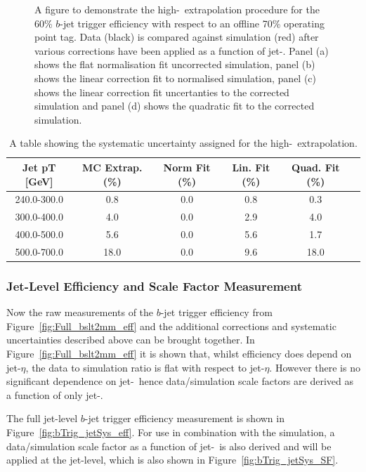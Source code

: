 \begin{figure}[!ht]
\begin{center}
\end{center}
\caption{A figure to demonstrate the high-\pT~extrapolation procedure for the 60\% $b$-jet trigger efficiency with respect to an offline 70\% operating point tag.
  Data (black) is compared against simulation (red) after various corrections have been applied  as a function of jet-\pT.
  Panel (a) shows the flat normalisation fit uncorrected simulation, panel (b) shows the linear correction fit to normalised simulation,
  panel (c) shows the linear correction fit uncertanties to the corrected simulation and panel (d) shows the quadratic fit to the corrected simulation.
  }
\label{fig:bTrig_mcExtrap}
\end{figure}

\begin{table}[!ht]
\begin{tabular}{|c||c||c|c|c|c|}
  \hline
  Jet pT [GeV] & MC Extrap. (\%) & Norm Fit (\%) & Lin. Fit (\%) & Quad. Fit (\%)\\
  \hline
  240.0-300.0 & 0.8 & 0.0  & 0.8 & 0.3\\
  300.0-400.0 & 4.0 & 0.0  & 2.9 & 4.0\\
  400.0-500.0 & 5.6 & 0.0  & 5.6 & 1.7\\
  500.0-700.0 & 18.0 & 0.0 & 9.6 & 18.0\\
  \hline
\end{tabular}
  \vspace{10pt}
\caption{A table showing the systematic uncertainty assigned for the high-\pT~extrapolation.}
\label{tab:bTrig_extrapSyst}
\end{table}

\FloatBarrier


\subsubsection{Jet-Level Efficiency and Scale Factor Measurement}
\label{sec:trig-jetLevelEff}

Now the raw measurements of the $b$-jet trigger efficiency from Figure~\ref{fig:Full_bslt2mm_eff}
and the additional corrections and systematic uncertainties described above can be brought together.
In Figure~\ref{fig:Full_bslt2mm_eff} it is shown that, whilst efficiency does depend on jet-$\eta$,
the data to simulation ratio is flat with respect to jet-$\eta$.
However there is no significant dependence on jet-\pT~hence data/simulation scale factors are derived as a function of only jet-\pT. 

The full jet-level $b$-jet trigger efficiency measurement is shown in Figure~\ref{fig:bTrig_jetSys_eff}.
For use in combination with the simulation, a data/simulation scale factor as a
function of jet-\pT~is also derived and will be applied at the jet-level, which is also shown in Figure~\ref{fig:bTrig_jetSys_SF}.

